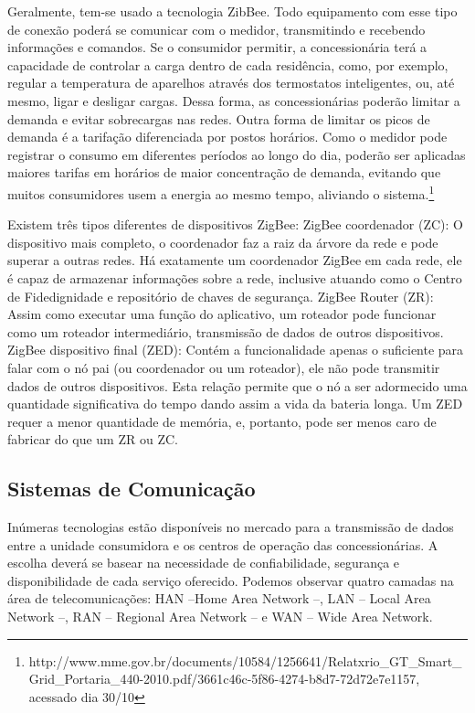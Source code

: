 	Geralmente, tem-se usado a tecnologia ZibBee. Todo equipamento com esse tipo de conexão poderá se comunicar com o medidor, transmitindo e recebendo informações e comandos. Se o consumidor permitir, a concessionária terá a capacidade de controlar a carga dentro de cada residência, como, por exemplo, regular a temperatura de aparelhos através dos termostatos inteligentes, ou, até mesmo, ligar e desligar cargas. Dessa forma, as concessionárias poderão limitar a demanda e evitar sobrecargas nas redes. Outra forma de limitar os picos de demanda é a tarifação diferenciada por postos horários. Como o medidor pode registrar o consumo em diferentes períodos ao longo do dia, poderão ser aplicadas maiores tarifas em horários de maior concentração de demanda, evitando que muitos consumidores usem a energia ao mesmo tempo, aliviando o sistema.\footnote{http://www.mme.gov.br/documents/10584/1256641/Relatxrio\_GT\_Smart\_Grid\_Portaria\_440-2010.pdf/3661c46c-5f86-4274-b8d7-72d72e7e1157, acessado dia 30/10}

	Existem três tipos diferentes de dispositivos ZigBee: ZigBee coordenador (ZC): O dispositivo mais completo, o coordenador faz a raiz da árvore da rede e pode superar a outras redes. Há exatamente um coordenador ZigBee em cada rede, ele é capaz de armazenar informações sobre a rede, inclusive atuando como o Centro de Fidedignidade e repositório de chaves de segurança. ZigBee Router (ZR): Assim como executar uma função do aplicativo, um roteador pode funcionar como um roteador intermediário, transmissão de dados de outros dispositivos. ZigBee dispositivo final (ZED): Contém a funcionalidade apenas o suficiente para falar com o nó pai (ou coordenador ou um roteador), ele não pode transmitir dados de outros dispositivos. Esta relação permite que o nó a ser adormecido uma quantidade significativa do tempo dando assim a vida da bateria longa. Um ZED requer a menor quantidade de memória, e, portanto, pode ser menos caro de fabricar do que um ZR ou ZC.

\subsection{Sistemas de Comunicação}

	Inúmeras tecnologias estão disponíveis no mercado para a transmissão de dados entre a unidade consumidora e os centros de operação das concessionárias. A escolha deverá se basear na necessidade de confiabilidade, segurança e disponibilidade de cada serviço oferecido. Podemos observar quatro camadas na área de telecomunicações: HAN –Home Area Network –, LAN – Local Area Network –, RAN – Regional Area Network – e WAN – Wide Area Network.

